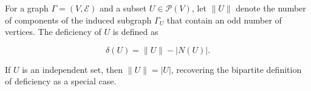 For a graph $\Gamma = (V, \mathcal{E})$ and a subset $U \in \mathcal{P}(V)$, let $\|U\|$ denote the number of components of the induced subgraph $\Gamma_U$ that contain an odd number of vertices. The deficiency of $U$ is defined as

$$\delta(U) = \|U\| - |N(U)|.$$

If $U$ is an independent set, then $\|U\| = |U|$, recovering the bipartite definition of deficiency as a special case.
